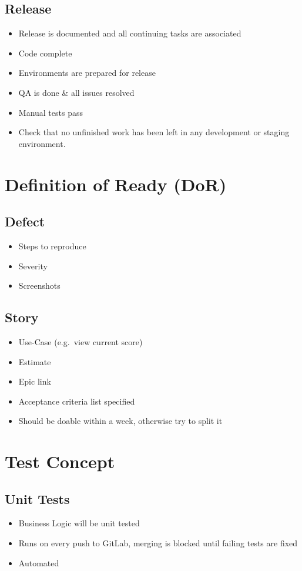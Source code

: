 \subsection{Release}
\begin{itemize}
    \item Release is documented and all continuing tasks are associated
    \item Code complete
    \item Environments are prepared for release
    \item QA is done \& all issues resolved
    \item Manual tests pass
    \item Check that no unfinished work has been left in any development or staging environment.
\end{itemize}

\section{Definition of Ready (DoR)}

\subsection{Defect}
\begin{itemize}
    \item Steps to reproduce
    \item Severity
    \item Screenshots
\end{itemize}

\subsection{Story}
\begin{itemize}
    \item Use-Case (e.g.\ view current score)
    \item Estimate
    \item Epic link
    \item Acceptance criteria list specified
    \item Should be doable within a week, otherwise try to split it
\end{itemize}

\section{Test Concept}
\subsection{Unit Tests}
\begin{itemize}
    \item Business Logic will be unit tested
    \item Runs on every push to GitLab, merging is blocked until failing tests are fixed
    \item Automated
\end{itemize}

